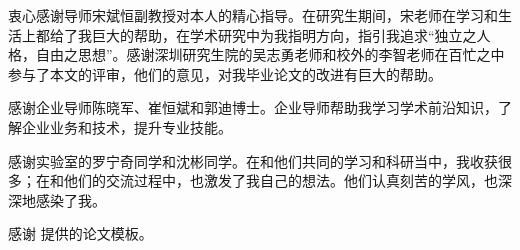 \begin{acknowledgement}
	衷心感谢导师宋斌恒副教授对本人的精心指导。在研究生期间，宋老师在学习和生活上都给了我巨大的帮助，在学术研究中为我指明方向，指引我追求“独立之人格，自由之思想”。感谢深圳研究生院的吴志勇老师和校外的李智老师在百忙之中参与了本文的评审，他们的意见，对我毕业论文的改进有巨大的帮助。
	
	感谢企业导师陈晓军、崔恒斌和郭迪博士。企业导师帮助我学习学术前沿知识，了解企业业务和技术，提升专业技能。
	
	感谢实验室的罗宁奇同学和沈彬同学。在和他们共同的学习和科研当中，我收获很多；在和他们的交流过程中，也激发了我自己的想法。他们认真刻苦的学风，也深深地感染了我。
	
	感谢 \thuthesis 提供的论文模板。
\end{acknowledgement}
